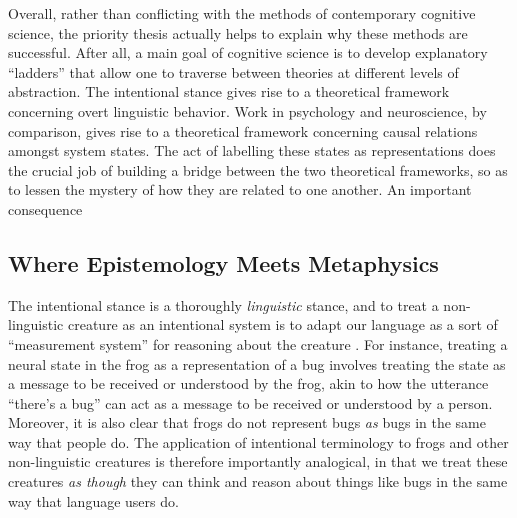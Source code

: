 Overall, rather than conflicting with the methods of contemporary cognitive science, the priority thesis actually helps to explain why these methods are successful. After all, a main goal of cognitive science is to develop explanatory ``ladders'' that allow one to traverse between theories at different levels of abstraction. The intentional stance gives rise to a theoretical framework concerning overt linguistic behavior. Work in psychology and neuroscience, by comparison, gives rise to a theoretical framework concerning causal relations amongst system states. The act of labelling these states as representations does the crucial job of building a bridge between the two theoretical frameworks, so as to lessen the mystery of how they are related to one another. An important consequence 

\subsection{Where Epistemology Meets Metaphysics}



The intentional stance is a thoroughly \textit{linguistic} stance, and to treat a non-linguistic creature as an intentional system is to adapt our language as a sort of ``measurement system'' for reasoning about the creature \citep[][p. 306]{Brandom:2010}. For instance, treating a neural state in the frog as a representation of a bug involves treating the state as a message to be received or understood by the frog, akin to how the utterance ``there's a bug'' can act as a message to be received or understood by a person. Moreover, it is also clear that frogs do not represent bugs \textit{as} bugs in the same way that people do. The application of intentional terminology to frogs and other non-linguistic creatures is therefore importantly analogical, in that we treat these creatures \textit{as though} they can think and reason about things like bugs in the same way that language users do.

